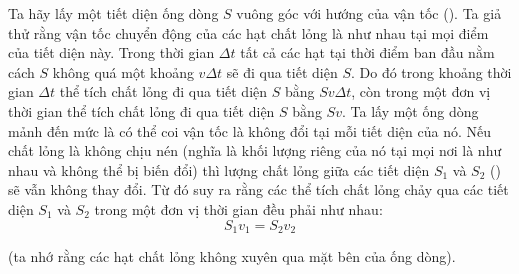 Ta hãy lấy một tiết diện ống dòng $S$ vuông góc với hướng của vận tốc (). Ta giả thử rằng vận tốc chuyển động của các hạt chất lỏng là như nhau tại mọi điểm của tiết diện này. Trong thời gian $\Delta t$ tất cả các hạt tại thời điểm ban đầu nằm cách $S$ không quá một khoảng $v\Delta t$ sẽ đi qua tiết diện $S$. Do đó trong khoảng thời gian $\Delta t$ thể tích chất lỏng đi qua tiết diện $S$ bằng $Sv\Delta t$, còn trong một đơn vị thời gian thể tích chất lỏng đi qua tiết diện $S$ bằng $Sv$. Ta lấy một ống dòng mảnh đến mức là có thể coi vận tốc là không đổi tại mỗi tiết diện của nó. Nếu chất lỏng là không chịu nén (nghĩa là khối lượng riêng của nó tại mọi nơi là như nhau và không thể bị biến đổi) thì lượng chất lỏng giữa các tiết diện $S_1$ và $S_2$ () sẽ vẫn không thay đổi. Từ đó suy ra rằng các thể tích chất lỏng chảy qua các tiết diện $S_1$ và $S_2$ trong một đơn vị thời gian đều phải như nhau:
\begin{equation*}
	S_1v_1 = S_2v_2
\end{equation*}

\noindent
(ta nhớ rằng các hạt chất lỏng không xuyên qua mặt bên của ống dòng).


